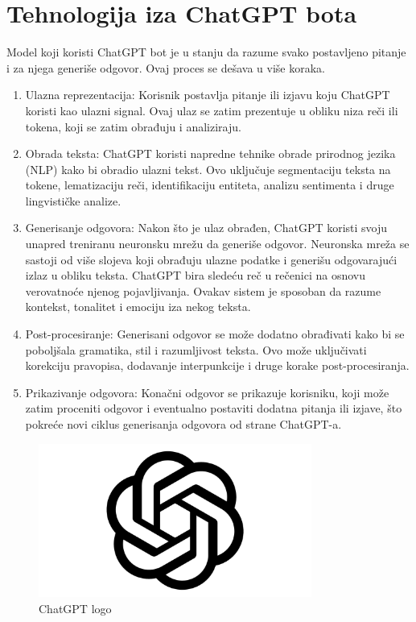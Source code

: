 \documentclass[fleqn, 12pt]{article}
\begin{document}
\section{Tehnologija iza ChatGPT bota}
\begin{text}
Model koji koristi ChatGPT bot je u stanju da razume svako postavljeno pitanje i za njega generiše odgovor. Ovaj proces se dešava u više koraka.
\end{text}
\begin{enumerate}
\item Ulazna reprezentacija: Korisnik postavlja pitanje ili izjavu koju ChatGPT koristi kao ulazni signal. Ovaj ulaz se zatim prezentuje u obliku niza reči ili tokena, koji se zatim obrađuju i analiziraju\cite{G4}.
\item Obrada teksta: ChatGPT koristi napredne tehnike obrade prirodnog jezika (NLP) kako bi obradio ulazni tekst. Ovo uključuje segmentaciju teksta na tokene, lematizaciju reči, identifikaciju entiteta, analizu sentimenta i druge lingvističke analize\cite{G4}.
\item Generisanje odgovora: Nakon što je ulaz obrađen, ChatGPT koristi svoju unapred treniranu neuronsku mrežu da generiše odgovor. Neuronska mreža se sastoji od više slojeva koji obrađuju ulazne podatke i generišu odgovarajući izlaz u obliku teksta. ChatGPT bira sledeću reč u rečenici na osnovu verovatnoće njenog pojavljivanja. Ovakav sistem je sposoban da razume kontekst, tonalitet i emociju iza nekog teksta\cite{G4}.
\item Post-procesiranje: Generisani odgovor se može dodatno obrađivati kako bi se poboljšala gramatika, stil i razumljivost teksta. Ovo može uključivati korekciju pravopisa, dodavanje interpunkcije i druge korake post-procesiranja\cite{G4}.
\item Prikazivanje odgovora: Konačni odgovor se prikazuje korisniku, koji može zatim proceniti odgovor i eventualno postaviti dodatna pitanja ili izjave, što pokreće novi ciklus generisanja odgovora od strane ChatGPT-a\cite{G4}.
\end{enumerate}

\begin{figure}[h!]
    \centering
    \includegraphics[width=0.8\textwidth]{ChatGPT-Logo.png}
    \caption{ChatGPT logo}
\end{figure}
\end{document}
